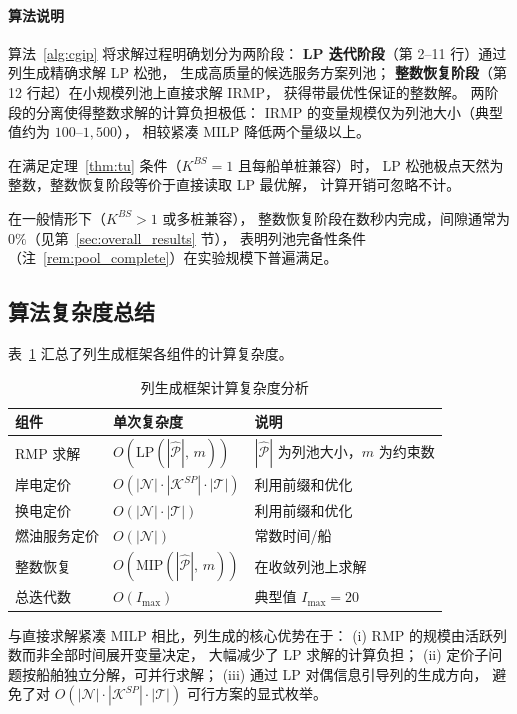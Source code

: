 \documentclass[UTF8, a4paper, 12pt]{ctexart}
\begin{document}
\paragraph{算法说明}
算法~\ref{alg:cgip} 将求解过程明确划分为两阶段：
\textbf{LP 迭代阶段}（第 2--11 行）通过列生成精确求解 LP 松弛，
生成高质量的候选服务方案列池；
\textbf{整数恢复阶段}（第 12 行起）在小规模列池上直接求解 IRMP，
获得带最优性保证的整数解。
两阶段的分离使得整数求解的计算负担极低：
IRMP 的变量规模仅为列池大小（典型值约为 $100$--$1{,}500$），
相较紧凑 MILP 降低两个量级以上。

在满足定理~\ref{thm:tu} 条件（$K^{BS}=1$ 且每船单桩兼容）时，
LP 松弛极点天然为整数，整数恢复阶段等价于直接读取 LP 最优解，
计算开销可忽略不计。

在一般情形下（$K^{BS}>1$ 或多桩兼容），
整数恢复阶段在数秒内完成，间隙通常为 $0\%$（见第~\ref{sec:overall_results} 节），
表明列池完备性条件（注~\ref{rem:pool_complete}）在实验规模下普遍满足。

\subsection{算法复杂度总结}
\label{sec:cg_complexity}

表~\ref{tab:complexity} 汇总了列生成框架各组件的计算复杂度。

\begin{table}[htbp]
\centering
\caption{列生成框架计算复杂度分析}
\label{tab:complexity}
\begin{tabular}{lll}
\toprule
组件 & 单次复杂度 & 说明 \\
\midrule
RMP 求解 & $O(\text{LP}(|\hat{\mathcal{P}}|,\, m))$
  & $|\hat{\mathcal{P}}|$ 为列池大小，$m$ 为约束数 \\
岸电定价 & $O(|\mathcal{N}| \cdot |\mathcal{K}^{SP}| \cdot |\mathcal{T}|)$
  & 利用前缀和优化 \\
换电定价 & $O(|\mathcal{N}| \cdot |\mathcal{T}|)$
  & 利用前缀和优化 \\
燃油服务定价 & $O(|\mathcal{N}|)$
  & 常数时间/船 \\
整数恢复 & $O(\text{MIP}(|\hat{\mathcal{P}}|,\, m))$
  & 在收敛列池上求解 \\
\midrule
总迭代数 & $O(I_{\max})$
  & 典型值 $I_{\max} = 20$ \\
\bottomrule
\end{tabular}
\end{table}

\noindent
与直接求解紧凑 MILP 相比，列生成的核心优势在于：
(i) RMP 的规模由活跃列数而非全部时间展开变量决定，
大幅减少了 LP 求解的计算负担；
(ii) 定价子问题按船舶独立分解，可并行求解；
(iii) 通过 LP 对偶信息引导列的生成方向，
避免了对 $O(|\mathcal{N}| \cdot |\mathcal{K}^{SP}| \cdot |\mathcal{T}|)$
可行方案的显式枚举。
\end{document}
